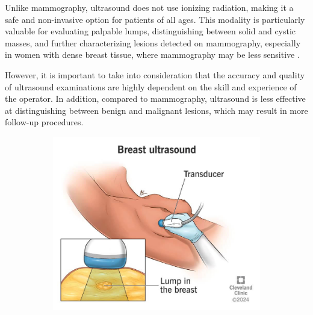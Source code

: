 \documentclass[a4paper,10pt]{book}
\begin{document}
Unlike mammography, ultrasound does not use ionizing radiation, making it a safe and non-invasive option for patients of all ages. This modality is particularly valuable for evaluating palpable lumps, distinguishing between solid and cystic masses, and further characterizing lesions detected on mammography, especially in women with dense breast tissue, where mammography may be less sensitive \cite{gokhale_ultrasound_2009}.

However, it is important to take into consideration that the accuracy and quality of ultrasound examinations are highly dependent on the skill and experience of the operator. In addition, compared to mammography, ultrasound is less effective at distinguishing between benign and malignant lesions, which may result in more follow-up procedures.

\begin{figure}[h!]
	\centering
	\begin{subfigure}[c]{0.45\textwidth}
		\centering
		\includegraphics[width=\textwidth]{reports/assets/breast_ultrasound.jpg}
            \caption{}
		\label{fig:breast_ultrasound}
	\end{subfigure}
	\begin{subfigure}[c]{0.45\textwidth}
		\centering

\end{subfigure}
\end{figure}
\end{document}
